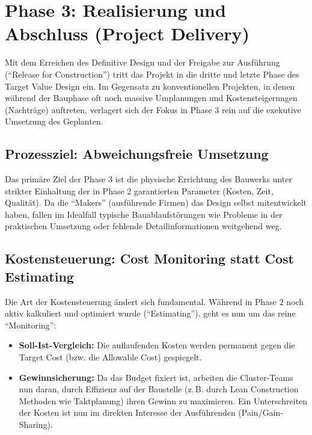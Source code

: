 \clearpage

\section{Phase 3: Realisierung und Abschluss (Project Delivery)}
\label{sec:4.5}


Mit dem Erreichen des Definitive Design und der Freigabe zur Ausführung (\enquote{Release for Construction}) tritt das Projekt in die dritte und letzte Phase des Target Value Design ein. Im Gegensatz zu konventionellen Projekten, in denen während der Bauphase oft noch massive Umplanungen und Kostensteigerungen (Nachträge) auftreten, verlagert sich der Fokus in Phase 3 rein auf die exekutive Umsetzung des Geplanten.\autocite[Vgl.][S.~135]{hill_target_2017}


\subsection{Prozessziel: Abweichungsfreie Umsetzung}
\label{sec:4.5.1}
Das primäre Ziel der Phase 3 ist die physische Errichtung des Bauwerks unter strikter Einhaltung der in Phase 2 garantierten Parameter (Kosten, Zeit, Qualität). Da die \enquote{Makers} (ausführende Firmen) das Design selbst mitentwickelt haben, fallen im Idealfall typische Bauablaufstörungen wie Probleme in der praktischen Umsetzung oder fehlende Detailinformationen weitgehend weg.

\subsection{Kostensteuerung: Cost Monitoring statt Cost Estimating}
\label{sec:4.5.2}
Die Art der Kostensteuerung ändert sich fundamental. Während in Phase 2 noch aktiv kalkuliert und optimiert wurde (\enquote{Estimating}), geht es nun um das reine \enquote{Monitoring}:\autocite[Vgl.][S.~105]{ballard_target_2025}
\begin{itemize}
    \item \textbf{Soll-Ist-Vergleich:} Die auflaufenden Kosten werden permanent gegen die Target Cost (bzw. die Allowable Cost) gespiegelt.
    \item \textbf{Gewinnsicherung:} Da das Budget fixiert ist, arbeiten die Cluster-Teams nun daran, durch Effizienz auf der Baustelle (z.\,B. durch Lean Construction Methoden wie Taktplanung) ihren Gewinn zu maximieren. Ein Unterschreiten der Kosten ist nun im direkten Interesse der Ausführenden (Pain/Gain-Sharing).
\end{itemize}

